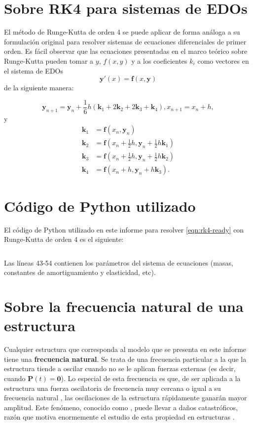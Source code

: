\begin{appendices}

\section{Sobre RK4 para sistemas de EDOs}\label{appendix:rk4-systems}

El método de Runge-Kutta de orden 4 se puede aplicar de forma análoga a su formulación original para resolver sistemas de ecuaciones diferenciales de primer orden. Es fácil observar que las ecuaciones presentadas en el marco teórico sobre Runge-Kutta pueden tomar a \(y\), \(f(x, y)\) y a los coeficientes \(k_i\) como vectores en el sistema de EDOs
\[
    \mathbf{y}'(x) = \mathbf{f}(x, \mathbf{y})
\]
de la siguiente manera:

\[
    \mathbf{y}_{n+1} = \mathbf{y}_n + \frac{1}{6}h(\mathbf{k}_1 + 2\mathbf{k}_2 + 2\mathbf{k}_3 + \mathbf{k}_4), x_{n+1} = x_n + h
,\]
y
\begin{align*}
    \mathbf{k}_1 &= \mathbf{f}(x_n, \mathbf{y}_n) \\
    \mathbf{k}_2 &= \mathbf{f}(x_n + \frac{1}{2}h, \mathbf{y}_n + \frac{1}{2}h\mathbf{k}_1) \\
    \mathbf{k}_3 &= \mathbf{f}(x_n + \frac{1}{2}h, \mathbf{y}_n + \frac{1}{2}h\mathbf{k}_2) \\
    \mathbf{k}_4 &= \mathbf{f}(x_n + h, \mathbf{y}_n + h\mathbf{k}_3)
.\end{align*}


\section{Código de Python utilizado}\label{appendix:rk4-code}

El código de Python utilizado en este informe para resolver \eqref{eqn:rk4-ready} con Runge-Kutta de orden 4 es el siguiente:

\inputminted{python}{./rk4.py}

Las líneas 43-54 contienen los parámetros del sistema de ecuaciones (masas, constantes de amortiguamiento y elasticidad, etc).

\section{Sobre la frecuencia natural de una estructura}\label{appendix:natural-frequency}

Cualquier estructura que corresponda al modelo que se presenta en este informe tiene una \textbf{frecuencia natural}. Se trata de una frecuencia particular a la que la estructura tiende a oscilar cuando no se le aplican fuerzas externas (es decir, cuando \(\mathbf{P}(t) = \mathbf{0}\)). Lo especial de esta frecuencia es que, de ser aplicada a la estructura una fuerza oscilatoria de frecuencia muy cercana o igual a su frecuencia natural , las oscilaciones de la estructura rápidamente ganarán mayor amplitud. Este fenómeno, conocido como , puede llevar a daños catastróficos, razón que motiva enormemente el estudio de esta propiedad en estructuras \citep{hernandez}.


\end{appendices}
